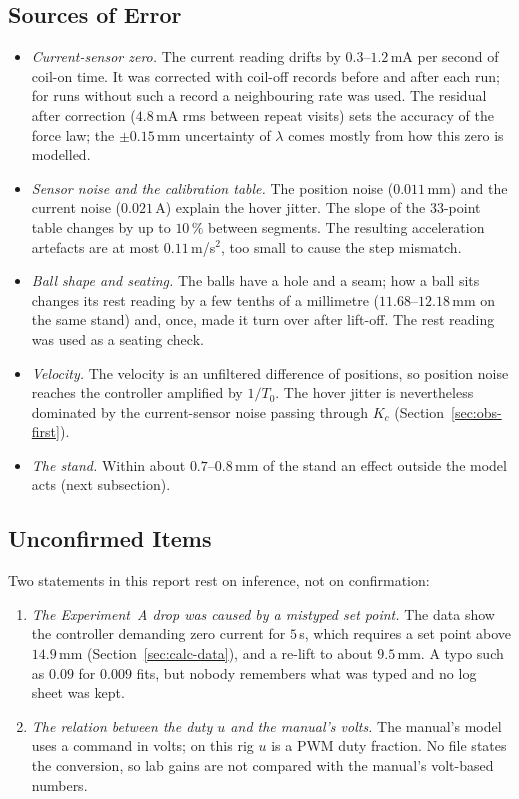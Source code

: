 \documentclass[11pt,a4paper]{article}
\begin{document}
\subsection{Sources of Error}
\label{sec:disc-errors}
\begin{itemize}
\item \emph{Current-sensor zero.} The current reading drifts by $0.3$--$1.2$\,mA per second of coil-on time. It was corrected
      with coil-off records before and after each run; for runs without such a record a neighbouring rate was used. The residual
      after correction ($4.8$\,mA rms between repeat visits) sets the accuracy of the force law; the $\pm0.15$\,mm uncertainty of
      $\lambda$ comes mostly from how this zero is modelled.
\item \emph{Sensor noise and the calibration table.} The position noise ($0.011$\,mm) and the current noise ($0.021$\,A)
      explain the hover jitter. The slope of the 33-point table changes by up to $10\,\%$ between segments. The resulting acceleration artefacts
      are at most $0.11$\,m/s$^2$, too small to cause the step mismatch.
\item \emph{Ball shape and seating.} The balls have a hole and a seam; how a ball sits changes its rest reading by a few
      tenths of a millimetre ($11.68$--$12.18$\,mm on the same stand) and, once, made it turn over after lift-off. The rest reading was used as a seating check.
\item \emph{Velocity.} The velocity is an unfiltered difference of positions, so position noise reaches the controller amplified
      by $1/T_0$. The hover jitter is nevertheless dominated by the current-sensor noise passing through $K_c$
      (Section~\ref{sec:obs-first}).


\item \emph{The stand.} Within about $0.7$--$0.8$\,mm of the stand an effect outside the model acts (next subsection).
\end{itemize}

\subsection{Unconfirmed Items}
\label{sec:disc-unconf}
Two statements in this report rest on inference, not on confirmation:
\begin{enumerate}
\item \emph{The Experiment~A drop was caused by a mistyped set point.} The data show the controller demanding zero current for
      $5$\,s, which requires a set point above $14.9$\,mm (Section~\ref{sec:calc-data}), and a re-lift to about $9.5$\,mm. A typo
      such as $0.09$ for $0.009$ fits, but nobody remembers what was typed and no log sheet was kept.
\item \emph{The relation between the duty $u$ and the manual's volts.} The manual's model uses a command in volts; on this rig $u$
      is a PWM duty fraction. No file states the conversion, so lab gains are not compared with the manual's volt-based numbers.
\end{enumerate}
\end{document}
